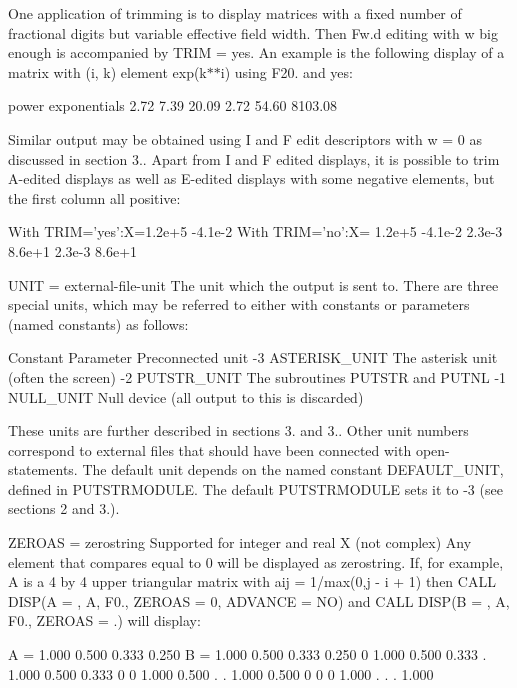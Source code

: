 One application of trimming is to display matrices with a fixed number of fractional digits but variable effective field width. Then Fw.\+d editing with w big enough is accompanied by T\+R\+IM = \textquotesingle{}yes\textquotesingle{}. An example is the following display of a matrix with (i, k) element exp(k$\ast$$\ast$i) using F20. and \textquotesingle{}yes\textquotesingle{}\+: \begin{DoxyVerb} power exponentials
2.72   7.39    20.09
2.72  54.60  8103.08
\end{DoxyVerb}


Similar output may be obtained using I and F edit descriptors with w = 0 as discussed in section 3.. Apart from I and F edited displays, it is possible to trim A-\/edited displays as well as E-\/edited displays with some negative elements, but the first column all positive\+: \begin{DoxyVerb}With TRIM='yes':X=1.2e+5 -4.1e-2   With TRIM='no':X= 1.2e+5 -4.1e-2
                  2.3e-3  8.6e+1                     2.3e-3  8.6e+1
\end{DoxyVerb}


U\+N\+IT = external-\/file-\/unit The unit which the output is sent to. There are three special units, which may be referred to either with constants or parameters (named constants) as follows\+: \begin{DoxyVerb}Constant  Parameter      Preconnected unit
  -3      ASTERISK_UNIT  The asterisk unit (often the screen)
  -2      PUTSTR_UNIT    The subroutines PUTSTR and PUTNL
  -1      NULL_UNIT      Null device (all output to this is discarded)
\end{DoxyVerb}


These units are further described in sections 3. and 3.. Other unit numbers correspond to external files that should have been connected with open-\/statements. The default unit depends on the named constant D\+E\+F\+A\+U\+L\+T\+\_\+\+U\+N\+IT, defined in P\+U\+T\+S\+T\+R\+M\+O\+D\+U\+LE. The default P\+U\+T\+S\+T\+R\+M\+O\+D\+U\+LE sets it to -\/3 (see sections 2 and 3.).

Z\+E\+R\+O\+AS = zerostring Supported for integer and real X (not complex) Any element that compares equal to 0 will be displayed as zerostring. If, for example, A is a 4 by 4 upper triangular matrix with aij = 1/max(0,j -\/ i + 1) then C\+A\+LL D\+I\+SP(\textquotesingle{}A = \textquotesingle{}, A, \textquotesingle{}F0.\textquotesingle{}, Z\+E\+R\+O\+AS = \textquotesingle{}0\textquotesingle{}, A\+D\+V\+A\+N\+CE = \textquotesingle{}NO\textquotesingle{}) and C\+A\+LL D\+I\+SP(\textquotesingle{}B = \textquotesingle{}, A, \textquotesingle{}F0.\textquotesingle{}, Z\+E\+R\+O\+AS = \textquotesingle{}.\textquotesingle{}) will display\+: \begin{DoxyVerb}A = 1.000  0.500  0.333  0.250   B = 1.000  0.500  0.333  0.250
        0  1.000  0.500  0.333        .     1.000  0.500  0.333
        0      0  1.000  0.500        .      .     1.000  0.500
        0      0      0  1.000        .      .      .     1.000
\end{DoxyVerb}


